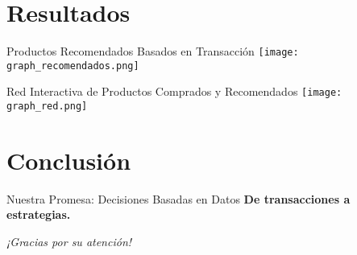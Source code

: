 \documentclass{beamer}
\begin{document}
\section{Resultados}
\begin{frame}{Productos Recomendados Basados en Transacción}
    \centering
    \texttt{[image: graph\_recomendados.png]}
    \vspace{0.5cm}
    \href{https://ffloresm30.github.io/Visualizaciones-apriori/graph_recomendados.html}{}
\end{frame}
\begin{frame}{Red Interactiva de Productos Comprados y Recomendados}
    \centering
    \texttt{[image: graph\_red.png]}
    \vspace{0.5cm}
    \href{https://ffloresm30.github.io/Visualizaciones-apriori/graph_red.html}{}
\end{frame}

\section{Conclusión}
\begin{frame}{Nuestra Promesa: Decisiones Basadas en Datos}
    \centering
    \Huge
    \textbf{De transacciones a estrategias.}
    
    \vspace{1em}
    \Large
    
    
    \vspace{1.5em}
    
    \vspace{1.5em}
    \large
    \textit{¡Gracias por su atención!}
\end{frame}
\end{document}
